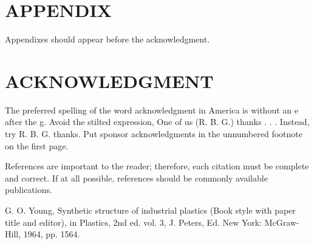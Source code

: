 \documentclass[letterpaper, 10 pt, conference]{ieeeconf}  %
\begin{document}






\section*{APPENDIX}

Appendixes should appear before the acknowledgment.

\section*{ACKNOWLEDGMENT}

The preferred spelling of the word acknowledgment in America is without an e after the g. Avoid the stilted expression, One of us (R. B. G.) thanks . . .  Instead, try R. B. G. thanks. Put sponsor acknowledgments in the unnumbered footnote on the first page.




References are important to the reader; therefore, each citation must be complete and correct. If at all possible, references should be commonly available publications.



\begin{thebibliography}{99}

 G. O. Young, Synthetic structure of industrial plastics (Book style with paper title and editor), 	in Plastics, 2nd ed. vol. 3, J. Peters, Ed.  New York: McGraw-Hill, 1964, pp. 1564.







\end{thebibliography}
\end{document}
